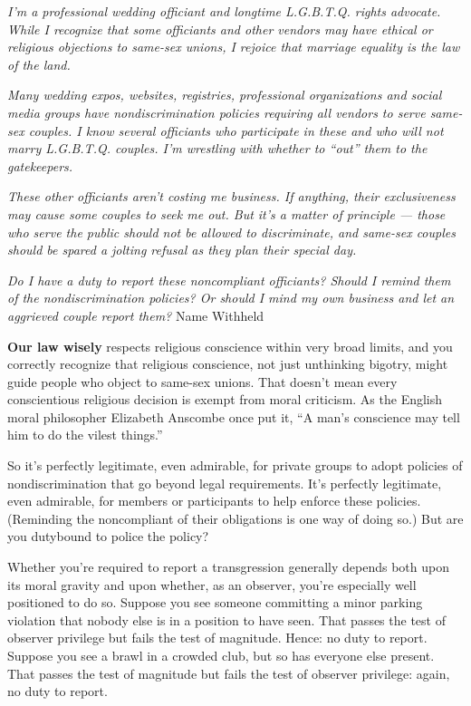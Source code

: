 \emph{I'm a professional wedding officiant and longtime L.G.B.T.Q.
rights advocate. While I recognize that some officiants and other
vendors may have ethical or religious objections to same-sex unions, I
rejoice that marriage equality is the law of the land.}

\emph{Many wedding expos, websites, registries, professional
organizations and social media groups have nondiscrimination policies
requiring all vendors to serve same-sex couples. I know several
officiants who participate in these and who will not marry L.G.B.T.Q.
couples. I'm wrestling with whether to ``out'' them to the gatekeepers.}

\emph{These other officiants aren't costing me business. If anything,
their exclusiveness may cause some couples to seek me out. But it's a
matter of principle --- those who serve the public should not be allowed
to discriminate, and same-sex couples should be spared a jolting refusal
as they plan their special day.}

\emph{Do I have a duty to report these noncompliant officiants? Should I
remind them of the nondiscrimination policies? Or should I mind my own
business and let an aggrieved couple report them?} Name Withheld

\textbf{Our law wisely} respects religious conscience within very broad
limits, and you correctly recognize that religious conscience, not just
unthinking bigotry, might guide people who object to same-sex unions.
That doesn't mean every conscientious religious decision is exempt from
moral criticism. As the English moral philosopher Elizabeth Anscombe
once put it, ``A man's conscience may tell him to do the vilest
things.''

So it's perfectly legitimate, even admirable, for private groups to
adopt policies of nondiscrimination that go beyond legal requirements.
It's perfectly legitimate, even admirable, for members or participants
to help enforce these policies. (Reminding the noncompliant of their
obligations is one way of doing so.) But are you dutybound to police the
policy?

Whether you're required to report a transgression generally depends both
upon its moral gravity and upon whether, as an observer, you're
especially well positioned to do so. Suppose you see someone committing
a minor parking violation that nobody else is in a position to have
seen. That passes the test of observer privilege but fails the test of
magnitude. Hence: no duty to report. Suppose you see a brawl in a
crowded club, but so has everyone else present. That passes the test of
magnitude but fails the test of observer privilege: again, no duty to
report.

